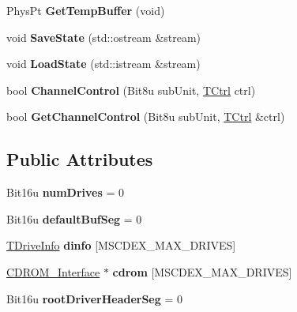 \begin{DoxyCompactItemize}
\item 
\hypertarget{classCMscdex_af32260380b7e357a0d77baaecbda6aef}{Phys\-Pt {\bfseries Get\-Temp\-Buffer} (void)}\label{classCMscdex_af32260380b7e357a0d77baaecbda6aef}

\item 
\hypertarget{classCMscdex_a9267374dbbd4c82f082cbfeb07ec7317}{void {\bfseries Save\-State} (std\-::ostream \&stream)}\label{classCMscdex_a9267374dbbd4c82f082cbfeb07ec7317}

\item 
\hypertarget{classCMscdex_a0cf511573055dc6f2f8d9669cca861e6}{void {\bfseries Load\-State} (std\-::istream \&stream)}\label{classCMscdex_a0cf511573055dc6f2f8d9669cca861e6}

\item 
\hypertarget{classCMscdex_a4c8cd11142b468ce00f7dbfe2e96830e}{bool {\bfseries Channel\-Control} (Bit8u sub\-Unit, \hyperlink{structSCtrl}{T\-Ctrl} ctrl)}\label{classCMscdex_a4c8cd11142b468ce00f7dbfe2e96830e}

\item 
\hypertarget{classCMscdex_a6facd9da08f3c1ccfa55094165b5dce1}{bool {\bfseries Get\-Channel\-Control} (Bit8u sub\-Unit, \hyperlink{structSCtrl}{T\-Ctrl} \&ctrl)}\label{classCMscdex_a6facd9da08f3c1ccfa55094165b5dce1}

\end{DoxyCompactItemize}
\subsection*{Public Attributes}
\begin{DoxyCompactItemize}
\item 
\hypertarget{classCMscdex_a5b4d6334bdd6f14e75354d225c865abe}{Bit16u {\bfseries num\-Drives} = 0}\label{classCMscdex_a5b4d6334bdd6f14e75354d225c865abe}

\item 
\hypertarget{classCMscdex_a74017c503ae2c44e5c78bfd3190005f8}{Bit16u {\bfseries default\-Buf\-Seg} = 0}\label{classCMscdex_a74017c503ae2c44e5c78bfd3190005f8}

\item 
\hypertarget{classCMscdex_a1392c8b86d5976dafb60694eef28abfa}{\hyperlink{structCMscdex_1_1SDriveInfo}{T\-Drive\-Info} {\bfseries dinfo} \mbox{[}M\-S\-C\-D\-E\-X\-\_\-\-M\-A\-X\-\_\-\-D\-R\-I\-V\-E\-S\mbox{]}}\label{classCMscdex_a1392c8b86d5976dafb60694eef28abfa}

\item 
\hypertarget{classCMscdex_aaadae67160be26c0a1bf0646a8030803}{\hyperlink{classCDROM__Interface}{C\-D\-R\-O\-M\-\_\-\-Interface} $\ast$ {\bfseries cdrom} \mbox{[}M\-S\-C\-D\-E\-X\-\_\-\-M\-A\-X\-\_\-\-D\-R\-I\-V\-E\-S\mbox{]}}\label{classCMscdex_aaadae67160be26c0a1bf0646a8030803}

\item 
\hypertarget{classCMscdex_a9dcc1cbe3482842e279f49d816fa3aaf}{Bit16u {\bfseries root\-Driver\-Header\-Seg} = 0}\label{classCMscdex_a9dcc1cbe3482842e279f49d816fa3aaf}

\end{DoxyCompactItemize}



